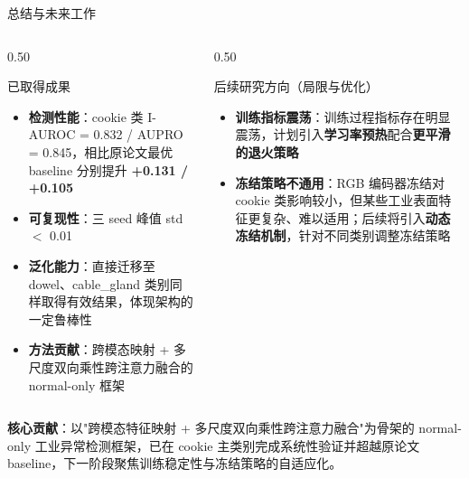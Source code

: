 \documentclass[10pt,aspectratio=43]{beamer}
\newcommand{\xmark}{\textcolor{AccentRed}{\ding{55}}}
\newcommand{\cmark}{\textcolor{ZJUBlue}{\ding{51}}}
\begin{document}
\begin{frame}{总结与未来工作}
  \vspace{-0.2em}
  \begin{columns}[T]
    \begin{column}{0.50\textwidth}
      \begin{block}{已取得成果}
        \footnotesize
        \begin{itemize}\footnotesize
          \item[\cmark] \textbf{检测性能}：cookie 类 I-AUROC = 0.832 / AUPRO = 0.845，相比原论文最优 baseline 分别提升 \textbf{+0.131 / +0.105}
          \item[\cmark] \textbf{可复现性}：三 seed 峰值 std $<$ 0.01
          \item[\cmark] \textbf{泛化能力}：直接迁移至 dowel、cable\_gland 类别同样取得有效结果，体现架构的一定鲁棒性
          \item[\cmark] \textbf{方法贡献}：跨模态映射 + 多尺度双向乘性跨注意力融合的 normal-only 框架
        \end{itemize}
      \end{block}
    \end{column}
    \begin{column}{0.50\textwidth}
      \begin{block}{后续研究方向（局限与优化）}
        \footnotesize
        \begin{itemize}\footnotesize
          \item[\xmark] \textbf{训练指标震荡}：训练过程指标存在明显震荡，计划引入\textbf{学习率预热}配合\textbf{更平滑的退火策略}
          \item[\xmark] \textbf{冻结策略不通用}：RGB 编码器冻结对 cookie 类影响较小，但某些工业表面特征更复杂、难以适用；后续将引入\textbf{动态冻结机制}，针对不同类别调整冻结策略
        \end{itemize}
      \end{block}
    \end{column}
  \end{columns}
  \vspace{0.4em}
  \begin{hlbox}
    \centering\footnotesize
    \textbf{核心贡献}：以"跨模态特征映射 + 多尺度双向乘性跨注意力融合"为骨架的 normal-only 工业异常检测框架，已在 cookie 主类别完成系统性验证并超越原论文 baseline，下一阶段聚焦训练稳定性与冻结策略的自适应化。
  \end{hlbox}
\end{frame}
\end{document}
